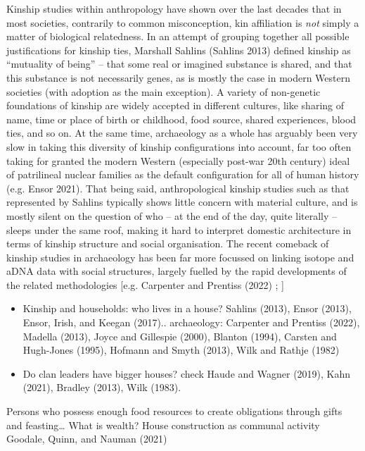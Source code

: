\documentclass[
  12pt,
]{book}
\begin{document}
Kinship studies within anthropology have shown over the last decades that in most societies, contrarily to common misconception, kin affiliation is \emph{not} simply a matter of biological relatedness. In an attempt of grouping together all possible justifications for kinship ties, Marshall Sahlins (Sahlins 2013) defined kinship as ``mutuality of being'' -- that some real or imagined substance is shared, and that this substance is not necessarily genes, as is mostly the case in modern Western societies (with adoption as the main exception). A variety of non-genetic foundations of kinship are widely accepted in different cultures, like sharing of name, time or place of birth or childhood, food source, shared experiences, blood ties, and so on. At the same time, archaeology as a whole has arguably been very slow in taking this diversity of kinship configurations into account, far too often taking for granted the modern Western (especially post-war 20th century) ideal of patrilineal nuclear families as the default configuration for all of human history (e.g. Ensor 2021). That being said, anthropological kinship studies such as that represented by Sahlins typically shows little concern with material culture, and is mostly silent on the question of who -- at the end of the day, quite literally -- sleeps under the same roof, making it hard to interpret domestic architecture in terms of kinship structure and social organisation. The recent comeback of kinship studies in archaeology has been far more focussed on linking isotope and aDNA data with social structures, largely fuelled by the rapid developments of the related methodologies {[}e.g. Carpenter and Prentiss (2022) ; {]}

\begin{itemize}
\item
  Kinship and households: who lives in a house? Sahlins (2013), Ensor (2013), Ensor, Irish, and Keegan (2017).. archaeology: Carpenter and Prentiss (2022), Madella (2013), Joyce and Gillespie (2000), Blanton (1994), Carsten and Hugh-Jones (1995), Hofmann and Smyth (2013), Wilk and Rathje (1982)
\item
  Do clan leaders have bigger houses? check Haude and Wagner (2019), Kahn (2021), Bradley (2013), Wilk (1983).
\end{itemize}

Persons who possess enough food resources to create obligations through gifts and feasting\ldots{} What is wealth? House construction as communal activity Goodale, Quinn, and Nauman (2021)
\end{document}
